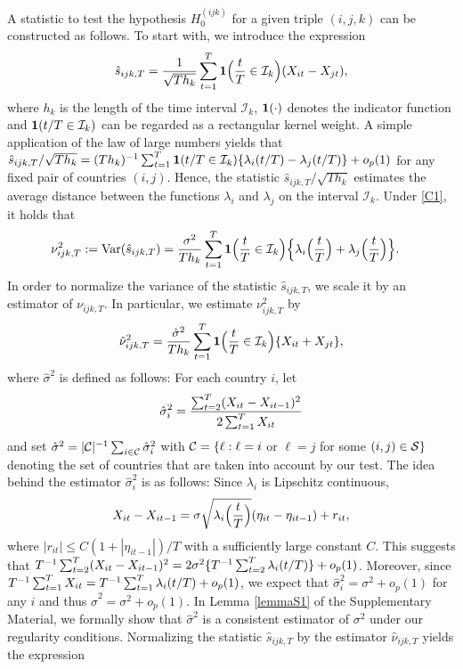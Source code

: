 \documentclass[a4paper,12pt]{article}
\numberwithin{equation}{section}
\begin{document}
A statistic to test the hypothesis $H_0^{(ijk)}$ for a given triple $(i,j,k)$ can be constructed as follows. To start with, we introduce the expression 
\[ \hat{s}_{ijk,T} = \frac{1}{\sqrt{Th_k}} \sum\limits_{t=1}^T \boldsymbol{1}\Big(\frac{t}{T} \in \mathcal{I}_k\Big) (X_{it} - X_{jt}), \]
where $h_k$ is the length of the time interval $\mathcal{I}_k$, $\boldsymbol{1}(\cdot)$ denotes the indicator function and $\boldsymbol{1}(t/T \in \mathcal{I}_k)$ can be regarded as a rectangular kernel weight. A simple application of the law of large numbers yields that $\hat{s}_{ijk,T}/\sqrt{Th_k} = (Th_k)^{-1} \sum_{t=1}^T \boldsymbol{1}(t/T \in \mathcal{I}_k) \{\lambda_i(t/T) - \lambda_j(t/T)\} + o_p(1)$ for any fixed pair of countries $(i,j)$. Hence, the statistic $\hat{s}_{ijk,T}/\sqrt{Th_k}$ estimates the average distance between the functions $\lambda_i$ and $\lambda_j$ on the interval $\mathcal{I}_k$. Under \ref{C1}, it holds that
\begin{align*}
\nu_{ijk,T}^2 := \textnormal{Var}(\hat{s}_{ijk,T}) 
 & = \frac{\sigma^2}{Th_k} \sum\limits_{t=1}^T \boldsymbol{1}\Big(\frac{t}{T} \in \mathcal{I}_k\Big) \Big\{ \lambda_i\Big(\frac{t}{T}\Big) + \lambda_j\Big(\frac{t}{T}\Big) \Big\}. 
\end{align*}
In order to normalize the variance of the statistic $\hat{s}_{ijk,T}$, we scale it by an estimator of $\nu_{ijk,T}$. In particular, we estimate $\nu_{ijk,T}^2$ by 
\[ \hat{\nu}_{ijk,T}^2 = \frac{\hat{\sigma}^2}{Th_k} \sum\limits_{t=1}^T \boldsymbol{1}\Big(\frac{t}{T} \in \mathcal{I}_k\Big) \{ X_{it} + X_{jt} \}, \]
where $\hat{\sigma}^2$ is defined as follows: For each country $i$, let 
\begin{align*}
\hat{\sigma}_i^2 = \frac{\sum_{t=2}^T (X_{it}-X_{it-1})^2}{2 \sum_{t=1}^T X_{it}}
\end{align*}
and set $\hat{\sigma}^2 = |\mathcal{C}|^{-1} \sum_{i \in \mathcal{C}} \hat{\sigma}_i^2$ with $\mathcal{C} = \{ \ell: \ell = i$ or $\ell = j$ for some $(i,j) \in \mathcal{S} \}$ denoting the set of countries that are taken into account by our test. The idea behind the estimator $\hat{\sigma}_i^2$ is as follows: Since $\lambda_i$ is Lipschitz continuous,  
\[ X_{it} - X_{it-1} = \sigma \sqrt{\lambda_i\Big(\frac{t}{T}\Big)} (\eta_{it} - \eta_{it-1}) + r_{it}, \]
where $|r_{it}| \le C(1+|\eta_{it-1}|)/T$ with a sufficiently large constant $C$. This suggests that $T^{-1} \sum_{t=2}^T (X_{it} - X_{it-1})^2 = 2 \sigma^2 \{ T^{-1} \sum_{t=2}^T \lambda_i(t/T) \} + o_p(1)$. Moreover, since $T^{-1} \sum_{t=1}^T X_{it} = T^{-1} \sum_{t=1}^T \lambda_i(t/T) + o_p(1)$, we expect that $\hat{\sigma}_i^2 = \sigma^2 + o_p(1)$ for any $i$ and thus $\hat{\sigma}^2 = \sigma^2 + o_p(1)$. In Lemma \ref{lemmaS1} of the Supplementary Material, we formally show that $\hat{\sigma}^2$ is a consistent estimator of $\sigma^2$ under our regularity conditions. Normalizing the statistic $\hat{s}_{ijk,T}$ by the estimator $\hat{\nu}_{ijk,T}$ yields the expression 
\end{document}
